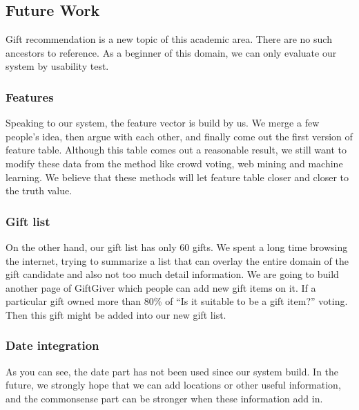 \documentclass[11pt,twocolumn]{article}
\begin{document}
\subsection{Future Work}

Gift recommendation is a new topic of this academic area.   There are no such ancestors to reference.   As a beginner of this domain, we can only evaluate our system by usability test. 

\subsubsection{Features}
Speaking to our system, the feature vector is build by us.   We merge a few people’s idea, then argue with each other, and finally come out the first version of feature table.
Although this table comes out a reasonable result, we still want to modify these data from the method like crowd voting, web mining and machine learning.   We believe that these methods will let feature table closer and closer to the truth value.

\subsubsection{Gift list}
On the other hand, our gift list has only 60 gifts.   We spent a long time browsing the internet, trying to summarize a list that can overlay the entire domain of the gift candidate and also not too much detail information.   We are going to build another page of GiftGiver which people can add new gift items on it.   If a particular gift owned more than 80\% of “Is it suitable to be a gift item?” voting.   Then this gift might be added into our new gift list.

\subsubsection{Date integration}
As you can see, the date part has not been used since our system build. In the future, we strongly hope that we can add locations or other useful information, and the commonsense part can be stronger when these information add in.


\newpage


\end{document}
